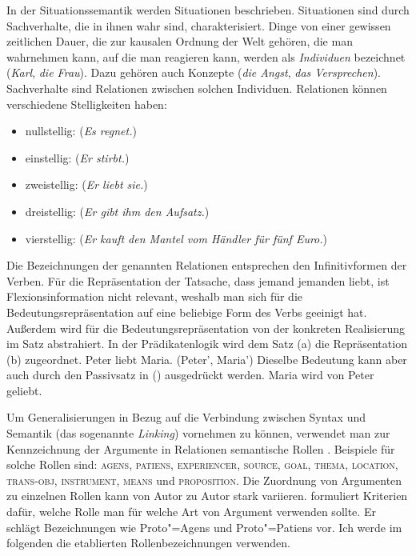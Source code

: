 In der Situationssemantik werden Situationen beschrieben.
Situationen sind durch Sachverhalte, die in ihnen wahr sind, charakterisiert.
Dinge von einer gewissen zeitlichen Dauer, die zur kausalen Ordnung der
Welt gehören, die man wahrnehmen kann, auf die man reagieren kann,
werden als \emph{Individuen} bezeichnet (\emph{Karl}, \emph{die Frau}).
Dazu gehören auch Konzepte (\emph{die Angst}, \emph{das Versprechen}).
Sachverhalte sind Relationen zwischen solchen Individuen.
Relationen können verschiedene Stelligkeiten haben:
\begin{itemize}
\item nullstellig:  (\emph{Es regnet.}) 
\item einstellig:  (\emph{Er stirbt.})
\item zweistellig:   (\emph{Er liebt sie.})
\item dreistellig:    (\emph{Er gibt ihm den Aufsatz.})
\item vierstellig:   (\emph{Er kauft den Mantel vom Händler für fünf Euro.})
\end{itemize}
Die Bezeichnungen der genannten Relationen entsprechen den Infinitivformen
der Verben. Für die Repräsentation der Tatsache, dass jemand jemanden liebt,
ist Flexionsinformation nicht relevant, weshalb man sich für die Bedeutungsrepräsentation
auf eine beliebige Form des Verbs geeinigt hat. Außerdem wird für die Bedeutungsrepräsentation
von der konkreten Realisierung im Satz abstrahiert. In der Prädikatenlogik wird
\zb dem Satz (a) die Repräsentation (b) zugeordnet.
\eal
\ex Peter liebt Maria.
\ex {}(Peter', Maria')
\zl
Dieselbe Bedeutung kann aber auch durch den Passivsatz in () ausgedrückt werden.
\ea
Maria wird von Peter geliebt.
\z

\noindent
Um Generalisierungen in Bezug auf die Verbindung zwischen Syntax und Semantik (das sogenannte
\emph{Linking}) vornehmen zu können, verwendet man zur Kennzeichnung der Argumente
in Relationen semantische Rollen \citep{Fillmore68,Fillmore77,Kunze91}. Beispiele für
solche Rollen sind: 
\textsc{agens}, 
\textsc{patiens}, 
\textsc{experiencer}, 
\textsc{source}, 
\textsc{goal}, 
\textsc{thema}, 
\textsc{location}, 
\textsc{trans-obj}, 
\textsc{instrument}, 
\textsc{means} und 
\textsc{proposition}.
Die Zuordnung von Argumenten zu einzelnen Rollen kann von Autor zu Autor stark variieren.
\citet{Dowty91a} formuliert Kriterien dafür, welche Rolle man für welche Art von Argument
verwenden sollte. Er schlägt Bezeichnungen wie Proto"=Agens und Proto"=Patiens vor.
Ich werde im folgenden die etablierten Rollenbezeichnungen verwenden.

